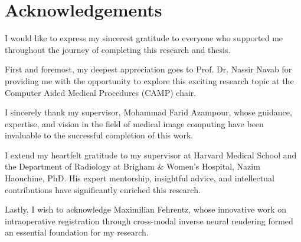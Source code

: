 




\chapter*{Acknowledgements}

I would like to express my sincerest gratitude to everyone who supported me throughout the journey of completing this research and thesis.

First and foremost, my deepest appreciation goes to Prof. Dr. Nassir Navab for providing me with the opportunity to explore this exciting research topic at the Computer Aided Medical Procedures (CAMP) chair.

I sincerely thank my supervisor, Mohammad Farid Azampour, whose guidance, expertise, and vision in the field of medical image computing have been invaluable to the successful completion of this work.

I extend my heartfelt gratitude to my supervisor at Harvard Medical School and the Department of Radiology at Brigham \& Women’s Hospital, Nazim Haouchine, PhD. His expert mentorship, insightful advice, and intellectual contributions have significantly enriched this research.

Lastly, I wish to acknowledge Maximilian Fehrentz, whose innovative work on intraoperative registration through cross-modal inverse neural rendering formed an essential foundation for my research.


\cleardoublepage{}
